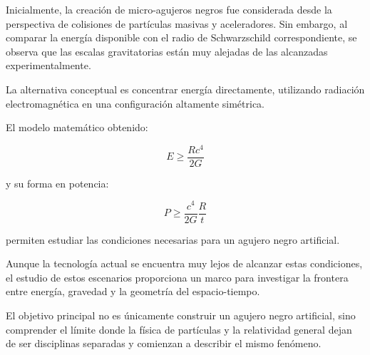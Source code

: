 \documentclass[a4paper,10pt,twocolumn]{article}
\begin{document}
Inicialmente, la creación de micro-agujeros negros fue considerada desde la perspectiva de colisiones de partículas masivas y aceleradores. Sin embargo, al comparar la energía disponible con el radio de Schwarzschild correspondiente, se observa que las escalas gravitatorias están muy alejadas de las alcanzadas experimentalmente.

La alternativa conceptual es concentrar energía directamente, utilizando radiación electromagnética en una configuración altamente simétrica.

El modelo matemático obtenido:

\begin{equation}
\boxed{E\geq\frac{Rc^4}{2G}}
\end{equation}

y su forma en potencia:

\begin{equation}
\boxed{P\geq\frac{c^4}{2G}\frac{R}{t}}
\end{equation}

permiten estudiar las condiciones necesarias para un agujero negro artificial.

Aunque la tecnología actual se encuentra muy lejos de alcanzar estas condiciones, el estudio de estos escenarios proporciona un marco para investigar la frontera entre energía, gravedad y la geometría del espacio-tiempo.

El objetivo principal no es únicamente construir un agujero negro artificial, sino comprender el límite donde la física de partículas y la relatividad general dejan de ser disciplinas separadas y comienzan a describir el mismo fenómeno.
\end{document}
